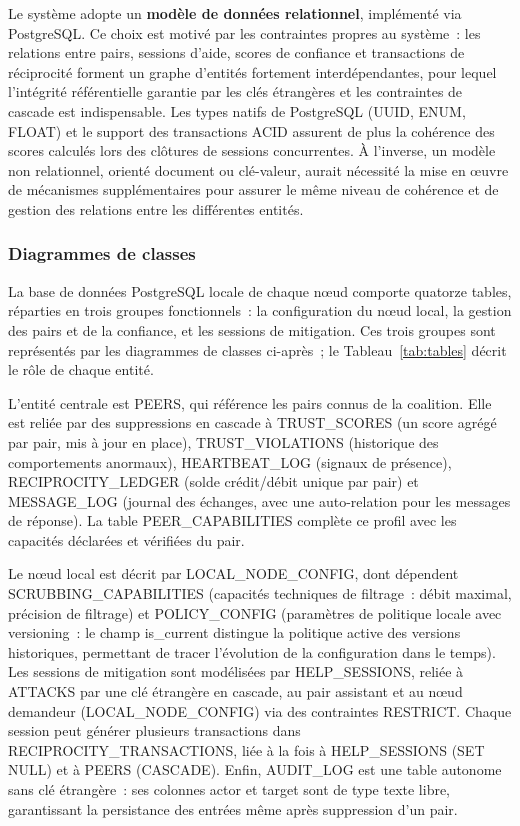Le système adopte un \textbf{modèle de données relationnel}, implémenté via PostgreSQL. Ce choix est motivé par les contraintes propres au système~: les relations entre pairs, sessions d'aide, scores de confiance et transactions de réciprocité forment un graphe d'entités fortement interdépendantes, pour lequel l'intégrité référentielle garantie par les clés étrangères et les contraintes de cascade est indispensable. Les types natifs de PostgreSQL ({UUID}, {ENUM}, {FLOAT}) et le support des transactions ACID assurent de plus la cohérence des scores calculés lors des clôtures de sessions concurrentes. À l’inverse, un modèle non relationnel, orienté document ou clé-valeur, aurait nécessité la mise en œuvre de mécanismes supplémentaires pour assurer le même niveau de cohérence et de gestion des relations entre les différentes entités.

\subsubsection{Diagrammes de classes}

La base de données PostgreSQL locale de chaque nœud comporte quatorze tables, réparties en trois groupes fonctionnels~: la configuration du nœud local, la gestion des pairs et de la confiance, et les sessions de mitigation. Ces trois groupes sont représentés par les diagrammes de classes ci-après~; le Tableau~\ref{tab:tables} décrit le rôle de chaque entité.

L'entité centrale est {PEERS}, qui référence les pairs connus de la coalition. Elle est reliée par des suppressions en cascade à {TRUST\_SCORES} (un score agrégé par pair, mis à jour en place), {TRUST\_VIOLATIONS} (historique des comportements anormaux), {HEARTBEAT\_LOG} (signaux de présence), {RECIPROCITY\_LEDGER} (solde crédit/débit unique par pair) et {MESSAGE\_LOG} (journal des échanges, avec une auto-relation pour les messages de réponse). La table {PEER\_CAPABILITIES} complète ce profil avec les capacités déclarées et vérifiées du pair.

Le nœud local est décrit par {LOCAL\_NODE\_CONFIG}, dont dépendent {SCRUBBING\_CAPABILITIES} (capacités techniques de filtrage~: débit maximal, précision de filtrage) et {POLICY\_CONFIG} (paramètres de politique locale avec versioning~: le champ {is\_current} distingue la politique active des versions historiques, permettant de tracer l'évolution de la configuration dans le temps). Les sessions de mitigation sont modélisées par {HELP\_SESSIONS}, reliée à {ATTACKS} par une clé étrangère en cascade, au pair assistant et au nœud demandeur ({LOCAL\_NODE\_CONFIG}) via des contraintes {RESTRICT}. Chaque session peut générer plusieurs transactions dans {RECIPROCITY\_TRANSACTIONS}, liée à la fois à {HELP\_SESSIONS} (SET NULL) et à {PEERS} (CASCADE). Enfin, {AUDIT\_LOG} est une table autonome sans clé étrangère~: ses colonnes {actor} et {target} sont de type texte libre, garantissant la persistance des entrées même après suppression d'un pair.


